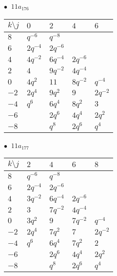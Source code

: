 \begin{minipage}{\linewidth}
$\bullet\ $ $11a_{176}$ \vspace{0.5em} \\
\begin{tabular}{l|llll}
$k \setminus j$ & $0$ & $2$ & $4$ & $6$ \\
\hline
$8$ & $q^{-6}$ & $q^{-8}$ &  &  \\
$6$ & $2q^{-4}$ & $2q^{-6}$ &  &  \\
$4$ & $4q^{-2}$ & $6q^{-4}$ & $2q^{-6}$ &  \\
$2$ & $4$ & $9q^{-2}$ & $4q^{-4}$ &  \\
$0$ & $4q^{2}$ & $11$ & $8q^{-2}$ & $q^{-4}$ \\
$-2$ & $2q^{4}$ & $9q^{2}$ & $9$ & $2q^{-2}$ \\
$-4$ & $q^{6}$ & $6q^{4}$ & $8q^{2}$ & $3$ \\
$-6$ &  & $2q^{6}$ & $4q^{4}$ & $2q^{2}$ \\
$-8$ &  & $q^{8}$ & $2q^{6}$ & $q^{4}$ \\
\end{tabular}
\vspace{2em}
\end{minipage}
%
\begin{minipage}{\linewidth}
$\bullet\ $ $11a_{177}$ \vspace{0.5em} \\
\begin{tabular}{l|llll}
$k \setminus j$ & $2$ & $4$ & $6$ & $8$ \\
\hline
$8$ & $q^{-6}$ & $q^{-8}$ &  &  \\
$6$ & $2q^{-4}$ & $2q^{-6}$ &  &  \\
$4$ & $3q^{-2}$ & $6q^{-4}$ & $2q^{-6}$ &  \\
$2$ & $3$ & $7q^{-2}$ & $4q^{-4}$ &  \\
$0$ & $3q^{2}$ & $9$ & $7q^{-2}$ & $q^{-4}$ \\
$-2$ & $2q^{4}$ & $7q^{2}$ & $7$ & $2q^{-2}$ \\
$-4$ & $q^{6}$ & $6q^{4}$ & $7q^{2}$ & $2$ \\
$-6$ &  & $2q^{6}$ & $4q^{4}$ & $2q^{2}$ \\
$-8$ &  & $q^{8}$ & $2q^{6}$ & $q^{4}$ \\
\end{tabular}
\vspace{2em}
\end{minipage}
%
